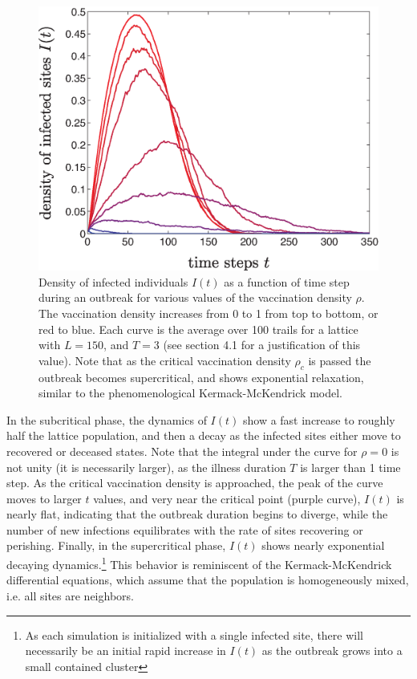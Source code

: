 \documentclass{article}
\begin{document}
\begin{figure}[H]
\centering
\includegraphics[scale=0.4]{figs/Inf_dynamics.eps}
\caption{Density of infected individuals $I(t)$ as a function of time step during an outbreak for various values of the vaccination density $\rho$. The vaccination density increases from 0 to 1 from top to bottom, or red to blue. Each curve is the average over 100 trails for a lattice with $L=150$, and $T=3$ (see section 4.1 for a justification of this value). Note that as the critical vaccination density $\rho_{c}$ is passed the outbreak becomes supercritical, and shows exponential relaxation, similar to the phenomenological Kermack-McKendrick model.}
\label{fig:I(t)}
\end{figure}

In the subcritical phase, the dynamics of $I(t)$ show a fast increase to roughly half the lattice population, and then a decay as the infected sites either move to recovered or deceased states. Note that the integral under the curve for $\rho=0$ is not unity (it is necessarily larger), as the illness duration $T$ is larger than 1 time step. As the critical vaccination density is approached, the peak of the curve moves to larger $t$ values, and very near the critical point (purple curve), $I(t)$ is nearly flat, indicating that the outbreak duration begins to diverge, while the number of new infections equilibrates with the rate of sites recovering or perishing. Finally, in the supercritical phase, $I(t)$ shows nearly exponential decaying dynamics.\footnote{As each simulation is initialized with a single infected site, there will necessarily be an initial rapid increase in $I(t)$ as the outbreak grows into a small contained cluster} This behavior is reminiscent of the Kermack-McKendrick differential equations, which assume that the population is homogeneously mixed, i.e. all sites are neighbors.
\end{document}
